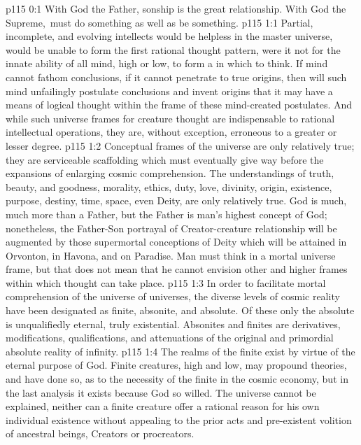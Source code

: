 \author{Mighty Messenger}
\vs p115 0:1 With God the Father, sonship is the great relationship. With God the Supreme,\linebreak{}\linebreak\ must do something as well as be something.
\vs p115 1:1 Partial, incomplete, and evolving intellects would be helpless in the master universe, would be unable to form the first rational thought pattern, were it not for the innate ability of all mind, high or low, to form a  in which to think. If mind cannot fathom conclusions, if it cannot penetrate to true origins, then will such mind unfailingly postulate conclusions and invent origins that it may have a means of logical thought within the frame of these mind\hyp{}created postulates. And while such universe frames for creature thought are indispensable to rational intellectual operations, they are, without exception, erroneous to a greater or lesser degree.
\vs p115 1:2 Conceptual frames of the universe are only relatively true; they are serviceable scaffolding which must eventually give way before the expansions of enlarging cosmic comprehension. The understandings of truth, beauty, and goodness, morality, ethics, duty, love, divinity, origin, existence, purpose, destiny, time, space, even Deity, are only relatively true. God is much, much more than a Father, but the Father is man’s highest concept of God; nonetheless, the Father\hyp{}Son portrayal of Creator\hyp{}creature relationship will be augmented by those supermortal conceptions of Deity which will be attained in Orvonton, in Havona, and on Paradise. Man must think in a mortal universe frame, but that does not mean that he cannot envision other and higher frames within which thought can take place.
\vs p115 1:3 In order to facilitate mortal comprehension of the universe of universes, the diverse levels of cosmic reality have been designated as finite, absonite, and absolute. Of these only the absolute is unqualifiedly eternal, truly existential. Absonites and finites are derivatives, modifications, qualifications, and attenuations of the original and primordial absolute reality of infinity.
\vs p115 1:4 The realms of the finite exist by virtue of the eternal purpose of God. Finite creatures, high and low, may propound theories, and have done so, as to the necessity of the finite in the cosmic economy, but in the last analysis it exists because God so willed. The universe cannot be explained, neither can a finite creature offer a rational reason for his own individual existence without appealing to the prior acts and pre\hyp{}existent volition of ancestral beings, Creators or procreators.
